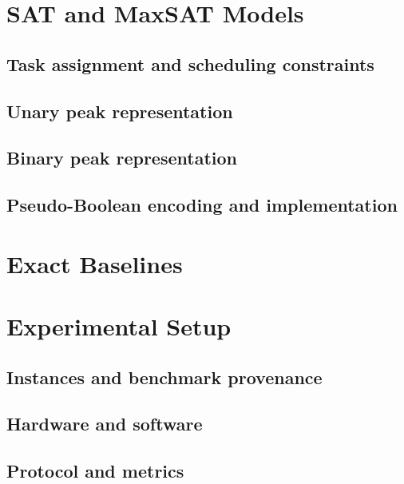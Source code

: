 \documentclass[a4paper,fleqn]{cas-sc}
\begin{document}
\section{SAT and MaxSAT Models}
\subsection{Task assignment and scheduling constraints}

\subsection{Unary peak representation}

\subsection{Binary peak representation}

\subsection{Pseudo-Boolean encoding and implementation}

\section{Exact Baselines}

\section{Experimental Setup}
\subsection{Instances and benchmark provenance}
\subsection{Hardware and software}
\subsection{Protocol and metrics}
\end{document}
